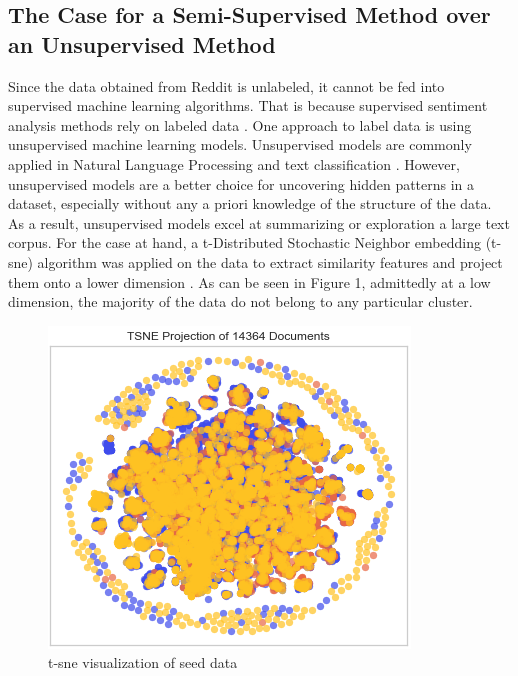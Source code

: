 \documentclass[11pt, a4paper]{article}
\begin{document}
\subsection{The Case for a Semi-Supervised Method over an Unsupervised Method} \label{subs:supervisedvsunsupervised}
Since the data obtained from Reddit is unlabeled, it cannot be fed into supervised machine learning algorithms. 
That is because supervised sentiment analysis methods rely on labeled data \citep{sazzed2021ssentia}. One approach to label 
data is using unsupervised machine learning models. Unsupervised models are commonly applied in Natural Language Processing 
and text classification \citep{jung2019automatedclassification}. However, unsupervised models are a better choice for uncovering hidden 
patterns in a dataset, especially without any a priori knowledge of the structure of the data. As a result, unsupervised models 
excel at summarizing or exploration a large text corpus. 
For the case at hand, a t-Distributed Stochastic Neighbor embedding (t-sne) algorithm was applied on the data to extract similarity 
features and project them onto a lower dimension \citep{binu2020dimreductiontsne}. As can be seen in Figure 1, admittedly 
at a low dimension, the majority of the data do not belong to any particular cluster.

\begin{figure}
    \centering
    \includegraphics[width=\textwidth]{tsne_projection.png}
    \caption{t-sne visualization of seed data}
    \label{fig:t-sne}
\end{figure}
\end{document}
